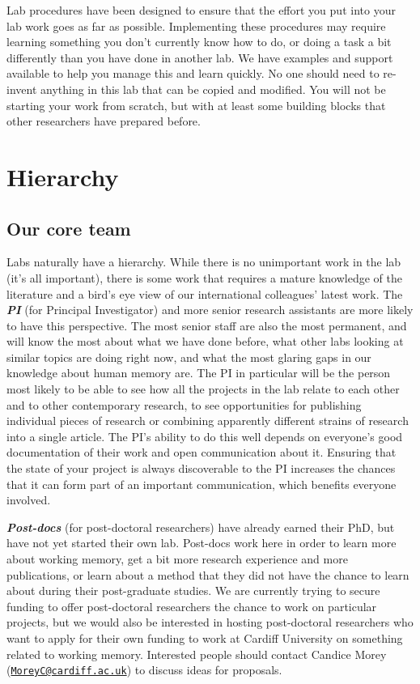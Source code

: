 \documentclass[12pt,]{book}
\theoremstyle{definition}
\theoremstyle{definition}
\theoremstyle{definition}
\theoremstyle{remark}
\begin{document}
Lab procedures have been designed to ensure that the effort you put into
your lab work goes as far as possible. Implementing these procedures may
require learning something you don't currently know how to do, or doing
a task a bit differently than you have done in another lab. We have
examples and support available to help you manage this and learn
quickly. No one should need to re-invent anything in this lab that can
be copied and modified. You will not be starting your work from scratch,
but with at least some building blocks that other researchers have
prepared before.

\section{Hierarchy}\label{hierarchy}

\subsection{Our core team}\label{our-core-team}

Labs naturally have a hierarchy. While there is no unimportant work in
the lab (it's all important), there is some work that requires a mature
knowledge of the literature and a bird's eye view of our international
colleagues' latest work. The \textbf{\emph{PI}} (for Principal
Investigator) and more senior research assistants are more likely to
have this perspective. The most senior staff are also the most
permanent, and will know the most about what we have done before, what
other labs looking at similar topics are doing right now, and what the
most glaring gaps in our knowledge about human memory are. The PI in
particular will be the person most likely to be able to see how all the
projects in the lab relate to each other and to other contemporary
research, to see opportunities for publishing individual pieces of
research or combining apparently different strains of research into a
single article. The PI's ability to do this well depends on everyone's
good documentation of their work and open communication about it.
Ensuring that the state of your project is always discoverable to the PI
increases the chances that it can form part of an important
communication, which benefits everyone involved.

\textbf{\emph{Post-docs}} (for post-doctoral researchers) have already
earned their PhD, but have not yet started their own lab. Post-docs work
here in order to learn more about working memory, get a bit more
research experience and more publications, or learn about a method that
they did not have the chance to learn about during their post-graduate
studies. We are currently trying to secure funding to offer
post-doctoral researchers the chance to work on particular projects, but
we would also be interested in hosting post-doctoral researchers who
want to apply for their own funding to work at Cardiff University on
something related to working memory. Interested people should contact
Candice Morey
(\href{mailto:MoreyC@cardiff.ac.uk}{\nolinkurl{MoreyC@cardiff.ac.uk}})
to discuss ideas for proposals.
\end{document}
